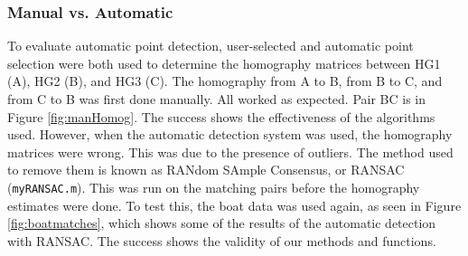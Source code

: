 \documentclass[a4paper, 10pt, conference]{ieeeconf}
\begin{document}
\subsubsection{Manual vs. Automatic}
To evaluate automatic point detection, user-selected and automatic point selection were both used to determine the homography matrices between HG1 (A), HG2 (B), and HG3 (C). The homography from A to B, from B to C, and from C to B was first done manually. All worked as expected. Pair BC is in Figure \ref{fig:manHomog}. The success shows the effectiveness of the algorithms used. However, when the automatic detection system was used, the homography matrices were wrong. This was due to the presence of outliers. The method used to remove them is known as RANdom SAmple Consensus, or RANSAC \cite{ransac} (\texttt{myRANSAC.m}). This was run on the matching pairs before the homography estimates were done. To test this, the boat data was used again, as seen in Figure \ref{fig:boatmatches}, which shows some of the results of the automatic detection with RANSAC. The success shows the validity of our methods and functions.
\end{document}
